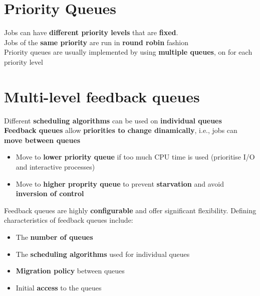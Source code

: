 \documentclass{article}
\begin{document}
\section{Priority Queues}
\begin{flushleft}
Jobs can have \textbf{different priority levels} that are \textbf{fixed}.\\
Jobs of the \textbf{same priority} are run in \textbf{round robin} fashion\\
Priority queues are usually implemented by using \textbf{multiple queues}, on for each priority level
\end{flushleft}

\section{Multi-level feedback queues}
\begin{flushleft}
Different \textbf{scheduling algorithms} can be used on \textbf{individual queues}\\
\textbf{Feedback queues} allow \textbf{priorities to change dinamically}, i.e., jobs can \textbf{move between queues}
\begin{itemize}
	\item Move to \textbf{lower priority queue} if too much CPU time is used (prioritise I/O and interactive processes)
	\item Move to \textbf{higher proprity queue} to prevent \textbf{starvation} and avoid \textbf{inversion of control}
\end{itemize}
\smallskip

Feedback queues are highly \textbf{configurable} and offer significant flexibility. Defining characteristics of feedback queues include:
\begin{itemize}
	\item The \textbf{number of queues}
	\item The \textbf{scheduling algorithms} used for individual queues
	\item \textbf{Migration policy} between queues
	\item Initial \textbf{access} to the queues
\end{itemize}
\end{flushleft}
\end{document}
